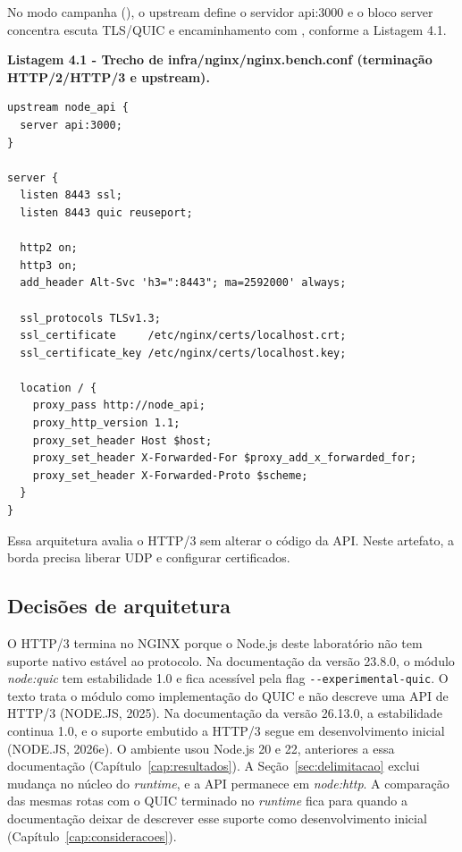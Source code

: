 No modo campanha (), o upstream  define o servidor api:3000 e o bloco server concentra escuta TLS/QUIC e encaminhamento com , conforme a Listagem 4.1.

\par\noindent
\begin{minipage}{\linewidth}
\centering
\textbf{Listagem 4.1 - Trecho de infra/nginx/nginx.bench.conf (terminação HTTP/2/HTTP/3 e upstream).}

\begin{lstlisting}
upstream node_api {
  server api:3000;
}

server {
  listen 8443 ssl;
  listen 8443 quic reuseport;

  http2 on;
  http3 on;
  add_header Alt-Svc 'h3=":8443"; ma=2592000' always;

  ssl_protocols TLSv1.3;
  ssl_certificate     /etc/nginx/certs/localhost.crt;
  ssl_certificate_key /etc/nginx/certs/localhost.key;

  location / {
    proxy_pass http://node_api;
    proxy_http_version 1.1;
    proxy_set_header Host $host;
    proxy_set_header X-Forwarded-For $proxy_add_x_forwarded_for;
    proxy_set_header X-Forwarded-Proto $scheme;
  }
}
\end{lstlisting}
\end{minipage}
\par

Essa arquitetura avalia o HTTP/3 sem alterar o código da API. Neste artefato, a borda precisa liberar UDP e configurar certificados.

\subsection{Decisões de arquitetura}\label{sec:decisoes-arquitetura}

O HTTP/3 termina no NGINX porque o Node.js deste laboratório não tem suporte nativo estável ao protocolo. Na documentação da versão 23.8.0, o módulo \textit{node:quic} tem estabilidade 1.0 e fica acessível pela flag \texttt{-{}-experimental-quic}. O texto trata o módulo como implementação do QUIC e não descreve uma API de HTTP/3 (NODE.JS, 2025). Na documentação da versão 26.13.0, a estabilidade continua 1.0, e o suporte embutido a HTTP/3 segue em desenvolvimento inicial (NODE.JS, 2026e). O ambiente usou Node.js 20 e 22, anteriores a essa documentação (Capítulo~\ref{cap:resultados}). A Seção~\ref{sec:delimitacao} exclui mudança no núcleo do \textit{runtime}, e a API permanece em \textit{node:http}. A comparação das mesmas rotas com o QUIC terminado no \textit{runtime} fica para quando a documentação deixar de descrever esse suporte como desenvolvimento inicial (Capítulo~\ref{cap:consideracoes}).

